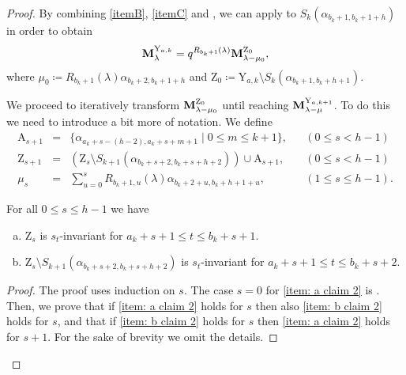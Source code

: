 \begin{proof}
By combining \cref{itemB}, \cref{itemC} and  , we can apply    to $S_{k}(\alpha_{b_k+1,b_k+1+h})$    in order to obtain
\begin{equation}\label{eq: third string lemma 1}
    \mathbf{M}_{\lambda}^{\mathrm{Y}_{a,k}} =  q^{R_{b_{k}+1}(\lambda)}\mathbf{M}_{\lambda - \mu_{0}}^{\mathrm{Z}_{0}},
\end{equation}
where $\mu_{0} \coloneq R_{b_{k}+1}(\lambda) \alpha_{b_{k}+2,b_{k}+1+h}$ and  $\mathrm{Z}_{0} \coloneq \mathrm{Y}_{a,k}\setminus S_{k}(\alpha_{b_k+1,b_k+h+1})$. 

\medskip
We proceed to iteratively transform $\mathbf{M}_{\lambda-\mu_{0}}^{\mathrm{Z}_{0}}$ until reaching $\mathbf{M}_{\lambda-\mu}^{\mathrm{Y}_{a,k+1}}$. 
To do this we need to introduce a bit more of notation. 
We define 
\begin{equation}
\begin{array}{rclll}
\mathrm{A}_{s+1} &  = & \displaystyle \{ \alpha_{a_k+s-(h-2),a_k+s+m+1} \mid 0\leq m \leq k+1  \}  , &  & (0\leq s < h-1)  \\[15pt]
\mathrm{Z}_{s+1} &= & \left(\mathrm{Z}_{s}\setminus  S_{k+1}(\alpha_{b_k+s+2,b_k+s+h+2 })  \right)\cup \mathrm{A}_{s+1}, &  & (0\leq s <h-1)\\[5pt]
\mu_{s} &=  & \displaystyle \sum_{u=0}^s R_{b_k+1,u} (\lambda) \alpha_{b_k+2+u,b_k+h+1+u}, &   &  (1\leq s \leq h-1). 
\end{array}
\end{equation}





\begin{claim}\label{claim: third string lemma 2}
For all  $0\leq s \leq h-1$ we have
\begin{enumerate}[(a)]
    \item\label{item: a claim 2} $\mathrm{Z}_{s}$ is $s_{t}$-invariant for $a_{k}+s+1\leq t \leq b_{k}+s+1$.
    \item\label{item: b claim 2} $\mathrm{Z}_{s}\setminus S_{k+1}(\alpha_{b_k+s+2,b_k+s+h+2 })$ is $s_{t}$-invariant for $a_{k}+s+1  \leq t \leq  b_{k}+s+2$.
\end{enumerate}
\end{claim}
\begin{proof}
    The proof uses induction on $s$. 
    The case $s=0$ for \cref{item: a claim 2} is . 
    Then, we prove that if \cref{item: a claim 2} holds for $s$ then also \cref{item: b claim 2} holds for $s$, and that if \cref{item: b claim 2} holds for $s$  then \cref{item: a claim 2} holds for $s+1$.  
    For the sake of brevity we omit the details. 
\end{proof}





\end{proof}
